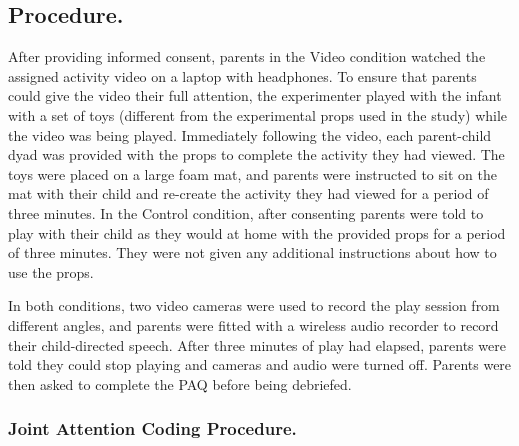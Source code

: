 \documentclass[10pt, letterpaper]{article}
\begin{document}
\subsection{Procedure.}\label{procedure.}

After providing informed consent, parents in the Video condition watched
the assigned activity video on a laptop with headphones. To ensure that
parents could give the video their full attention, the experimenter
played with the infant with a set of toys (different from the
experimental props used in the study) while the video was being played.
Immediately following the video, each parent-child dyad was provided
with the props to complete the activity they had viewed. The toys were
placed on a large foam mat, and parents were instructed to sit on the
mat with their child and re-create the activity they had viewed for a
period of three minutes. In the Control condition, after consenting
parents were told to play with their child as they would at home with
the provided props for a period of three minutes. They were not given
any additional instructions about how to use the props.

In both conditions, two video cameras were used to record the play
session from different angles, and parents were fitted with a wireless
audio recorder to record their child-directed speech. After three
minutes of play had elapsed, parents were told they could stop playing
and cameras and audio were turned off. Parents were then asked to
complete the PAQ before being debriefed.

\subsubsection{Joint Attention Coding
Procedure.}\label{joint-attention-coding-procedure.}
\end{document}

